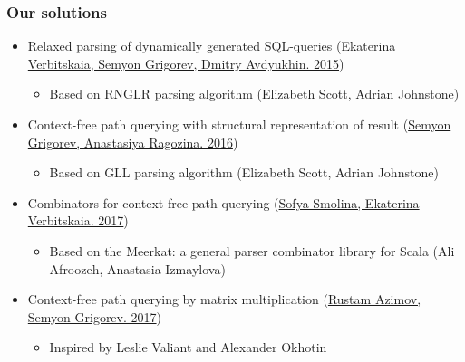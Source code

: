 \documentclass{beamer}
\begin{document}
\begin{frame}
  \transwipe[direction=90]
  \frametitle{Our solutions}
  \begin{itemize}
    \item Relaxed parsing of dynamically generated SQL-queries (\href{https://link.springer.com/chapter/10.1007/978-3-319-41579-6\_22}{Ekaterina Verbitskaia, Semyon Grigorev, Dmitry Avdyukhin. 2015})
    \begin{itemize}
        \item Based on RNGLR parsing algorithm (Elizabeth Scott, Adrian Johnstone)
    \end{itemize}
    \item Context-free path querying with structural representation of result (\href{https://arxiv.org/abs/1612.08872}{Semyon Grigorev, Anastasiya Ragozina. 2016})
    \begin{itemize}
        \item Based on GLL parsing algorithm (Elizabeth Scott, Adrian Johnstone)
    \end{itemize}
    \item Combinators for context-free path querying (\href{http://plc.sfedu.ru/files/PLC-2017-proceedings.pdf\#page=233}{Sofya Smolina, Ekaterina Verbitskaia. 2017})
    \begin{itemize}
        \item Based on the Meerkat: a general parser combinator library for Scala (Ali Afroozeh, Anastasia Izmaylova)
    \end{itemize}
    \item Context-free path querying by matrix multiplication (\href{https://arxiv.org/abs/1707.01007}{Rustam Azimov, Semyon Grigorev. 2017})
    \begin{itemize}
        \item Inspired by Leslie Valiant and Alexander Okhotin
    \end{itemize}
  \end{itemize}
\end{frame}
\end{document}
